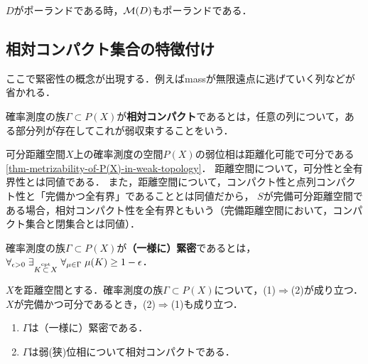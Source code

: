 \documentclass[uplatex,dvipdfmx]{jsreport}
\begin{document}
\begin{theorem}
    $D$がポーランドである時，$\mathcal{M}(D)$もポーランドである．
\end{theorem}

\subsection{相対コンパクト集合の特徴付け}

\begin{tcolorbox}[colframe=ForestGreen, colback=ForestGreen!10!white,breakable,colbacktitle=ForestGreen!40!white,coltitle=black,fonttitle=\bfseries\sffamily,
title=]
    ここで緊密性の概念が出現する．例えばmassが無限遠点に逃げていく列などが省かれる．
\end{tcolorbox}

\begin{definition}
    確率測度の族$\Gamma\subset P(X)$が\textbf{相対コンパクト}であるとは，任意の列について，ある部分列が存在してこれが弱収束することをいう．
\end{definition}
\begin{remarks}
    可分距離空間$X$上の確率測度の空間$P(X)$の弱位相は距離化可能で可分である\ref{thm-metrizability-of-P(X)-in-weak-topology}．
    距離空間について，可分性と全有界性とは同値である．
    また，距離空間について，コンパクト性と点列コンパクト性と「完備かつ全有界」であることとは同値だから，
    $S$が完備可分距離空間である場合，相対コンパクト性を全有界ともいう（完備距離空間において，コンパクト集合と閉集合とは同値）．
\end{remarks}

\begin{definition}
    確率測度の族$\Gamma\subset P(X)$が\textbf{（一様に）緊密}であるとは，
    $\forall_{\epsilon>0}\;\exists_{K\overset{\text{cpt}}{\subset} X}\;\forall_{\mu\in\Gamma}\;\mu(K)\ge 1-\epsilon$．
\end{definition}

\begin{theorem}
    $X$を距離空間とする．確率測度の族$\Gamma\subset P(X)$について，(1)$\Rightarrow$(2)が成り立つ．
    $X$が完備かつ可分であるとき，(2)$\Rightarrow$(1)も成り立つ．
    \begin{enumerate}
        \item  $\Gamma$は（一様に）緊密である．
        \item $\Gamma$は弱(狭)位相について相対コンパクトである．
    \end{enumerate}
\end{theorem}
\end{document}
